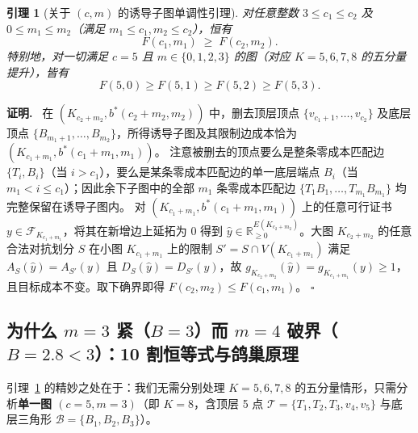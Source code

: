 \documentclass[11pt,a4paper]{ctexart}
\newtheorem{lemma}[theorem]{引理}
\theoremstyle{definition}
\newenvironment{proofcn}{\par\noindent\textbf{证明.}\ }{\hfill$\square$\par}
\newcommand{\RR}{\mathbb R}
\newcommand{\1}{\boldsymbol 1}
\newcommand{\0}{\boldsymbol 0}
\begin{document}
\begin{lemma}[关于 $(c,m)$ 的诱导子图单调性引理]\label{lem:subgraph_mono}
对任意整数 $3\le c_1\le c_2$ 及 $0\le m_1\le m_2$（满足 $m_1\le c_1,m_2\le c_2$），恒有
\begin{equation}\label{eq:F_mono}
 \boxed{F(c_1,m_1) \;\ge\; F(c_2,m_2).}
\end{equation}
特别地，对一切满足 $c=5$ 且 $m\in\{0,1,2,3\}$ 的图（对应 $K=5,6,7,8$ 的五分量提升），皆有
\begin{equation}\label{eq:F_53_dom}
 F(5,0)\ge F(5,1)\ge F(5,2)\ge F(5,3).
\end{equation}
\end{lemma}
\begin{proofcn}
在 $(K_{c_2+m_2},b^*(c_2+m_2,m_2))$ 中，删去顶层顶点 $\{v_{c_1+1},\dots,v_{c_2}\}$ 及底层顶点 $\{B_{m_1+1},\dots,B_{m_2}\}$，所得诱导子图及其限制边成本恰为 $(K_{c_1+m_1},b^*(c_1+m_1,m_1))$。
注意被删去的顶点要么是整条零成本匹配边 $\{T_i,B_i\}$（当 $i>c_1$），要么是某条零成本匹配边的单一底层端点 $B_i$（当 $m_1<i\le c_1$）；因此余下子图中的全部 $m_1$ 条零成本匹配边 $\{T_1B_1,\dots,T_{m_1}B_{m_1}\}$ 均完整保留在诱导子图内。
对 $(K_{c_1+m_1},b^*(c_1+m_1,m_1))$ 上的任意可行证书 $y\in\mathcal F_{K_{c_1+m_1}}$，将其在新增边上延拓为 $0$ 得到 $\hat y\in\RR_{\ge 0}^{E(K_{c_2+m_2})}$。大图 $K_{c_2+m_2}$ 的任意合法对抗划分 $S$ 在小图 $K_{c_1+m_1}$ 上的限制 $S'=S\cap V(K_{c_1+m_1})$ 满足 $A_S(\hat y)=A_{S'}(y)$ 且 $D_S(\hat y)=D_{S'}(y)$，故 $g_{K_{c_2+m_2}}(\hat y)=g_{K_{c_1+m_1}}(y)\ge 1$，且目标成本不变。取下确界即得 $F(c_2,m_2)\le F(c_1,m_1)$。
\end{proofcn}

\subsection{为什么 $m=3$ 紧（$B=3$）而 $m=4$ 破界（$B=2.8<3$）：10 割恒等式与鸽巢原理}
引理~\ref{lem:subgraph_mono} 的精妙之处在于：我们无需分别处理 $K=5,6,7,8$ 的五分量情形，只需分析\textbf{单一图 $(c=5,m=3)$}（即 $K=8$，含顶层 5 点 $\mathcal T=\{T_1,T_2,T_3,v_4,v_5\}$ 与底层三角形 $\mathcal B=\{B_1,B_2,B_3\}$）。
\end{document}
